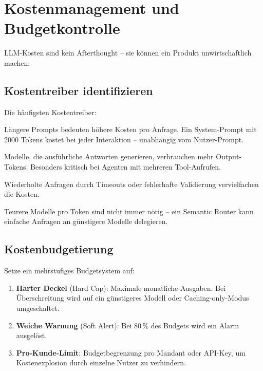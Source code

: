 \section{Kostenmanagement und Budgetkontrolle}

LLM-Kosten sind kein Afterthought -- sie können ein Produkt unwirtschaftlich machen.

\subsection{Kostentreiber identifizieren}

Die häufigsten Kostentreiber:

\begin{description}[leftmargin=*,style=nextline]
    \item[Kontextfenster] Längere Prompts bedeuten höhere Kosten pro Anfrage. Ein System-Prompt mit 2000 Tokens kostet bei jeder Interaktion -- unabhängig vom Nutzer-Prompt.
    \item[Output-Länge] Modelle, die ausführliche Antworten generieren, verbrauchen mehr Output-Tokens. Besonders kritisch bei Agenten mit mehreren Tool-Aufrufen.
    \item[Fehlertoleranz] Wiederholte Anfragen durch Timeouts oder fehlerhafte Validierung vervielfachen die Kosten.
    \item[Modellwahl] Teurere Modelle pro Token sind nicht immer nötig -- ein Semantic Router kann einfache Anfragen an günstigere Modelle delegieren.
\end{description}

\subsection{Kostenbudgetierung}

Setze ein mehrstufiges Budgetsystem auf:

\begin{enumerate}[leftmargin=*]
    \item \textbf{Harter Deckel} (Hard Cap): Maximale monatliche Ausgaben. Bei Überschreitung wird auf ein günstigeres Modell oder Caching-only-Modus umgeschaltet.
    \item \textbf{Weiche Warnung} (Soft Alert): Bei 80\,\% des Budgets wird ein Alarm ausgelöst.
    \item \textbf{Pro-Kunde-Limit}: Budgetbegrenzung pro Mandant oder API-Key, um Kostenexplosion durch einzelne Nutzer zu verhindern.
\end{enumerate}

